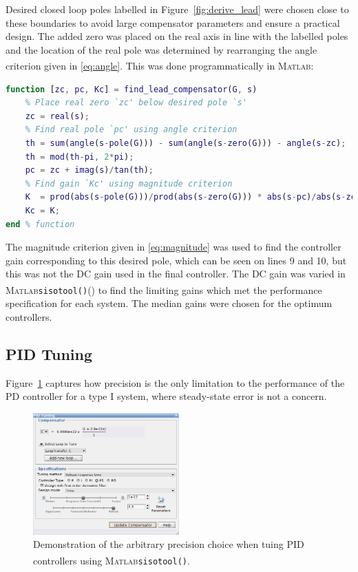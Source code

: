 \documentclass[a4paper,10pt,twocolumn]{article}
\newcommand{\Matlab}{\textsc{Matlab}\textsuperscript{\textregistered}\xspace}
\newcommand{\sisotool}{\texttt{sisotool()}\xspace}
\begin{document}
Desired closed loop poles labelled in Figure~\ref{fig:derive_lead} were chosen close to these boundaries to avoid large compensator parameters and ensure a practical design. The added zero was placed on the real axis in line with the labelled poles and the location of the real pole was determined by rearranging the angle criterion given in \eqref{eq:angle}. This was done programmatically in \Matlab:
\begin{lstlisting}[language=Matlab,style=mystyle,morekeywords={mod,pole,zero,dcgain}]
function [zc, pc, Kc] = find_lead_compensator(G, s)
	% Place real zero `zc' below desired pole `s'
	zc = real(s);
	% Find real pole `pc' using angle criterion
	th = sum(angle(s-pole(G))) - sum(angle(s-zero(G))) - angle(s-zc);
	th = mod(th-pi, 2*pi);
	pc = zc + imag(s)/tan(th);
	% Find gain `Kc' using magnitude criterion
	K  = prod(abs(s-pole(G)))/prod(abs(s-zero(G))) * abs(s-pc)/abs(s-zc);
	Kc = K;
end % function
\end{lstlisting}

The magnitude criterion given in \eqref{eq:magnitude} was used to find the controller gain corresponding to this desired pole, which can be seen on lines 9 and 10, but this was not the DC gain used in the final controller. The DC gain was varied in \Matlab \sisotool() to find the limiting gains which met the performance specification for each system. The median gains were chosen for the optimum controllers.

\subsection{PID Tuning}

Figure~\ref{fig:pid_tune} captures how precision is the only limitation to the performance of the PD controller for a type I system, where steady-state error is not a concern.

\begin{figure}[h!]
	\centering
	\includegraphics[width=0.5\textwidth]{img/pid_tune.png}
	\caption{Demonstration of the arbitrary precision choice when tuing PID controllers using \Matlab \sisotool.}
	\label{fig:pid_tune}
\end{figure}
\end{document}
